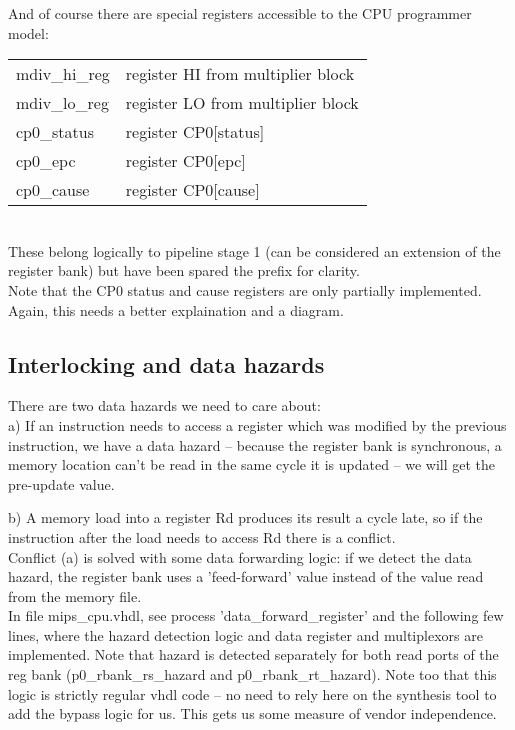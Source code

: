 \documentclass[11pt]{article}
\begin{document}
    
    And of course there are special registers accessible to the CPU programmer 
    model:\\
    
    \begin{tabular}{ p{4cm} l }
        mdiv\_hi\_reg     & register HI from multiplier block\\
        mdiv\_lo\_reg     & register LO from multiplier block\\
        cp0\_status      & register CP0[status]\\
        cp0\_epc         & register CP0[epc]\\
        cp0\_cause       & register CP0[cause]
    \end{tabular}\\
    
    These belong logically to pipeline stage 1 (can be considered an extension
    of the register bank) but have been spared the prefix for clarity.\\

    Note that the CP0 status and cause registers are only partially implemented.\\

    Again, this needs a better explaination and a diagram.\\


\subsection{Interlocking and data hazards}
\label{interlocking_and_data_hazards}

    There are two data hazards we need to care about:\\
    
    a) If an instruction needs to access a register which was modified by the
    previous instruction, we have a data hazard -- because the register bank is
    synchronous, a memory location can't be read in the same cycle it is updated
    -- we will get the pre-update value.
    
    b) A memory load into a register Rd produces its result a cycle late, so if
    the instruction after the load needs to access Rd there is a conflict.\\


    Conflict (a) is solved with some data forwarding logic: if we detect the
    data hazard, the register bank uses a 'feed-forward' value instead of the
    value read from the memory file. \\
    In file mips\_cpu.vhdl, see process 'data\_forward\_register' and the following
    few lines, where the hazard detection logic and data register and 
    multiplexors are implemented. Note that hazard is detected separately for
    both read ports of the reg bank (p0\_rbank\_rs\_hazard and p0\_rbank\_rt\_hazard).
    Note too that this logic is strictly regular vhdl code -- no need to rely here
    on the synthesis tool to add the bypass logic for us. This gets us some
    measure of vendor independence.\\
    
\end{document}
